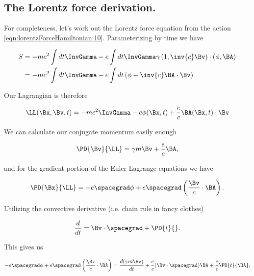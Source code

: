 \subsection{The Lorentz force derivation.}

For completeness, let's work out the Lorentz force equation from the action \ref{eqn:lorentzForceHamiltonian:10}.  Parameterizing by time we have

\begin{align*}
S 
&= -m c^2 \int dt \InvGamma - e \int dt \InvGamma \gamma \left( 1, \inv{c} \Bv\right) \cdot (\phi, \BA) \\
&= -m c^2 \int dt \InvGamma - e \int dt \left( \phi - \inv{c} \BA \cdot \Bv \right)
\end{align*}

Our Lagrangian is therefore

\begin{equation}\label{eqn:lorentzForceHamiltonian:20}
\LL(\Bx, \Bv, t) = 
-m c^2 \InvGamma - e \phi(\Bx, t) + \frac{e}{c} \BA(\Bx, t) \cdot \Bv
\end{equation}

We can calculate our conjugate momentum easily enough

\begin{equation}\label{eqn:lorentzForceHamiltonian:40}
\PD{\Bv}{\LL} = \gamma m \Bv + \frac{e}{c} \BA,
\end{equation}

and for the gradient portion of the Euler-Lagrange equations we have

\begin{equation}\label{eqn:lorentzForceHamiltonian:60}
\PD{\Bx}{\LL} = -e \spacegrad \phi + e \spacegrad \left( \frac{\Bv}{c} \cdot \BA \right).
\end{equation}

Utilizing the convective derivative (i.e. chain rule in fancy clothes) 

\begin{equation}\label{eqn:lorentzForceHamiltonian:80}
\frac{d}{dt} = \Bv \cdot \spacegrad + \PD{t}{}.
\end{equation}

This gives us

\begin{equation}\label{eqn:lorentzForceHamiltonian:100}
-e \spacegrad \phi + e \spacegrad \left( \frac{\Bv}{c} \cdot \BA \right) = 
\frac{d(\gamma m \Bv)}{dt} 
+ \frac{e}{c} (\Bv \cdot \spacegrad) \BA
+ \frac{e}{c} \PD{t}{\BA},
\end{equation}

